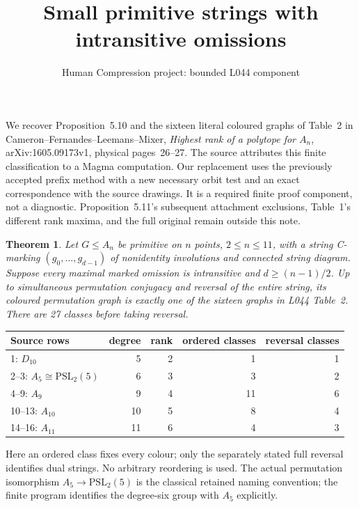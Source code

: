 \documentclass[11pt,a4paper]{article}
\title{Small primitive strings with intransitive omissions}
\author{Human Compression project: bounded L044 component}
\date{}
\newtheorem{theorem}{Theorem}
\begin{document}
\maketitle
We recover Proposition~5.10 and the sixteen literal coloured graphs of
Table~2 in Cameron--Fernandes--Leemans--Mixer,
\emph{Highest rank of a polytope for $A_n$}, arXiv:1605.09173v1,
physical pages~26--27. The source attributes this finite classification
to a Magma computation. Our replacement uses the previously accepted
prefix method with a new necessary orbit test and an exact correspondence
with the source drawings. It is a required finite proof component,
not a diagnostic. Proposition~5.11's subsequent attachment exclusions,
Table~1's different rank maxima, and the full original remain outside
this note.

\begin{theorem}\label{thm:small}
Let $G\leq A_n$ be primitive on $n$ points, $2\leq n\leq11$,
with a string C-marking $(g_0,\ldots,g_{d-1})$ of nonidentity involutions
and connected string diagram. Suppose every maximal marked omission
is intransitive and $d\geq(n-1)/2$. Up to simultaneous permutation
conjugacy and reversal of the entire string, its coloured permutation
graph is exactly one of the sixteen graphs in L044 Table~2.
There are 27 classes before taking reversal.
\end{theorem}

\begin{center}
\begin{tabular}{lrrrr}
\toprule
Source rows & degree & rank & ordered classes & reversal classes\\
\midrule
1: $D_{10}$ &5&2&1&1\\
2--3: $A_5\cong\mathrm{PSL}_2(5)$ &6&3&3&2\\
4--9: $A_9$ &9&4&11&6\\
10--13: $A_{10}$ &10&5&8&4\\
14--16: $A_{11}$ &11&6&4&3\\
\bottomrule
\end{tabular}
\end{center}
Here an ordered class fixes every colour; only the separately stated
full reversal identifies dual strings. No arbitrary reordering is used.
The actual permutation isomorphism $A_5\to\mathrm{PSL}_2(5)$ is the
classical retained naming convention; the finite program identifies
the degree-six group with $A_5$ explicitly.
\end{document}
